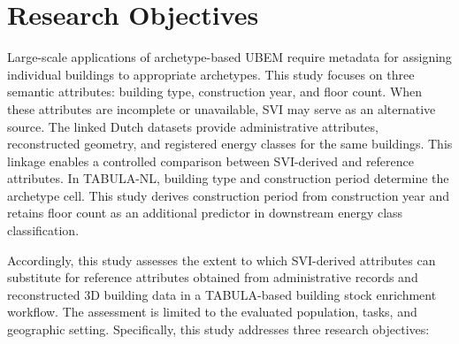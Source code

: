 \section{Research Objectives}
\label{sec:research_objectives}

Large-scale applications of archetype-based \ac{UBEM} require metadata for assigning individual buildings to appropriate archetypes. This study focuses on three semantic attributes: building type, construction year, and floor count. When these attributes are incomplete or unavailable, \ac{SVI} may serve as an alternative source. The linked Dutch datasets provide administrative attributes, reconstructed geometry, and registered energy classes for the same buildings. This linkage enables a controlled comparison between \ac{SVI}-derived and reference attributes. In TABULA-NL, building type and construction period determine the archetype cell. This study derives construction period from construction year and retains floor count as an additional predictor in downstream energy class classification.

Accordingly, this study assesses the extent to which \ac{SVI}-derived attributes can substitute for reference attributes obtained from administrative records and reconstructed 3D building data in a TABULA-based building stock enrichment workflow. The assessment is limited to the evaluated population, tasks, and geographic setting. Specifically, this study addresses three research objectives:

